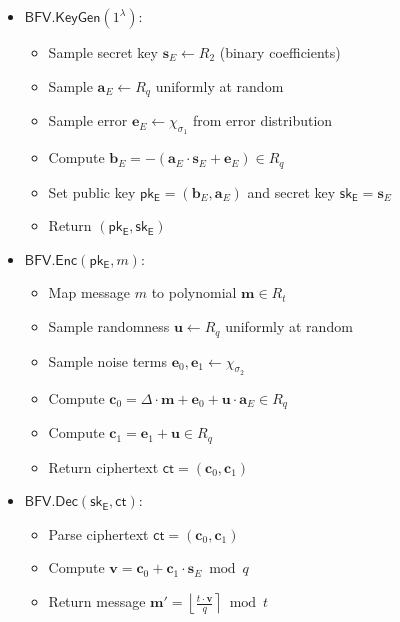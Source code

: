\begin{itemize}
\item $\mathsf{BFV.KeyGen}(1^\lambda)$:
   \begin{itemize}
       \item Sample secret key $\mathbf{s}_E \leftarrow R_2$ (binary coefficients)
       \item Sample $\mathbf{a}_E \leftarrow R_q$ uniformly at random
       \item Sample error $\mathbf{e}_E \leftarrow \chi_{\sigma_1}$ from error distribution
       \item Compute $\mathbf{b}_E = -(\mathbf{a}_E \cdot \mathbf{s}_E + \mathbf{e}_E) \in R_q$
       \item Set public key $\mathsf{pk_E} = (\mathbf{b}_E, \mathbf{a}_E)$ and secret key $\mathsf{sk_E} = \mathbf{s}_E$
       \item Return $(\mathsf{pk_E}, \mathsf{sk_E})$
   \end{itemize}

\item $\mathsf{BFV.Enc}(\mathsf{pk_E}, m)$:
   \begin{itemize}
       \item Map message $m$ to polynomial $\mathbf{m} \in R_t$
       \item Sample randomness $\mathbf{u} \leftarrow R_q$ uniformly at random
       \item Sample noise terms $\mathbf{e}_0, \mathbf{e}_1 \leftarrow \chi_{\sigma_2}$
       \item Compute $\mathbf{c}_0 = \Delta \cdot \mathbf{m} + \mathbf{e}_0 + \mathbf{u} \cdot \mathbf{a}_E \in R_q$
       \item Compute $\mathbf{c}_1 = \mathbf{e}_1 + \mathbf{u} \in R_q$
       \item Return ciphertext $\mathsf{ct} = (\mathbf{c}_0, \mathbf{c}_1)$
   \end{itemize}
   
\item $\mathsf{BFV.Dec}(\mathsf{sk_E}, \mathsf{ct})$:
   \begin{itemize}
       \item Parse ciphertext $\mathsf{ct} = (\mathbf{c}_0, \mathbf{c}_1)$
       \item Compute $\mathbf{v} = \mathbf{c}_0 + \mathbf{c}_1 \cdot \mathbf{s}_E \bmod q$
       \item Return message $\mathbf{m}' = \left\lfloor \frac{t \cdot \mathbf{v}}{q} \right\rceil \bmod t$
   \end{itemize}
   

\end{itemize}
